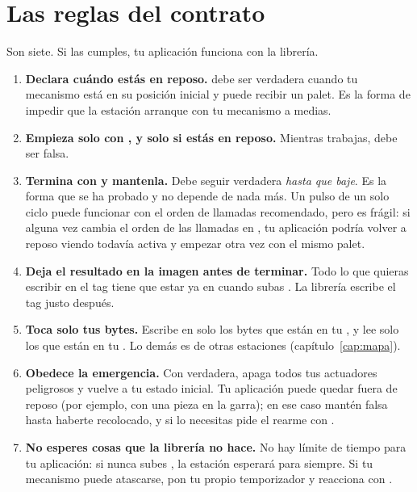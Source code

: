 \section{Las reglas del contrato}\label{sec:reglas}
Son siete. Si las cumples, tu aplicación funciona con la librería.

\begin{enumerate}[leftmargin=1.2cm,label=\textbf{R\arabic*.}]
\item \textbf{Declara cuándo estás en reposo.}  debe ser verdadera cuando tu mecanismo está en su posición inicial y puede recibir un palet. Es la forma de impedir que la estación arranque con tu mecanismo a medias.
\item \textbf{Empieza solo con , y solo si estás en reposo.} Mientras trabajas,  debe ser falsa.
\item \textbf{Termina con  y mantenla.} Debe seguir verdadera \emph{hasta que  baje}. Es la forma que se ha probado y no depende de nada más. Un pulso de un solo ciclo puede funcionar con el orden de llamadas recomendado, pero es frágil: si alguna vez cambia el orden de las llamadas en , tu aplicación podría volver a reposo viendo  todavía activa y empezar otra vez con el mismo palet.
\item \textbf{Deja el resultado en la imagen antes de terminar.} Todo lo que quieras escribir en el tag tiene que estar ya en  cuando subas . La librería escribe el tag justo después.
\item \textbf{Toca solo tus bytes.} Escribe en  solo los bytes que están en tu , y lee solo los que están en tu . Lo demás es de otras estaciones (capítulo~\ref{cap:mapa}).
\item \textbf{Obedece la emergencia.} Con  verdadera, apaga todos tus actuadores peligrosos y vuelve a tu estado inicial. Tu aplicación puede quedar fuera de reposo (por ejemplo, con una pieza en la garra); en ese caso mantén  falsa hasta haberte recolocado, y si lo necesitas pide el rearme con .
\item \textbf{No esperes cosas que la librería no hace.} No hay límite de tiempo para tu aplicación: si nunca subes , la estación esperará para siempre. Si tu mecanismo puede atascarse, pon tu propio temporizador y reacciona con .
\end{enumerate}


